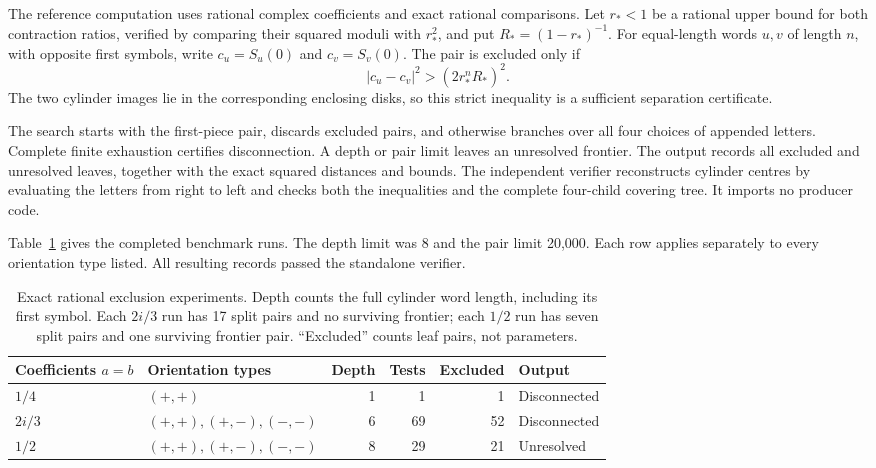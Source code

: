 The reference computation uses rational complex coefficients and exact rational
comparisons. Let $r_*<1$ be a rational upper bound for both contraction ratios,
verified by comparing their squared moduli with $r_*^2$, and put
$R_*=(1-r_*)^{-1}$. For equal-length words $u,v$ of length $n$, with opposite
first symbols, write $c_u=S_u(0)$ and $c_v=S_v(0)$. The pair is excluded only if
\begin{equation}\label{eq:exact-disk-exclusion}
|c_u-c_v|^2>(2r_*^nR_*)^2.
\end{equation}
The two cylinder images lie in the corresponding enclosing disks, so this
strict inequality is a sufficient separation certificate.

The search starts with the first-piece pair, discards excluded pairs, and
otherwise branches over all four choices of appended letters. Complete finite
exhaustion certifies disconnection. A depth or pair limit leaves an unresolved
frontier. The output records all excluded and unresolved leaves, together with
the exact squared distances and bounds. The independent verifier reconstructs
cylinder centres by evaluating the letters from right to left and checks both
the inequalities and the complete four-child covering tree. It imports no
producer code.

Table~\ref{tab:exact-benchmarks} gives the completed benchmark runs. The depth
limit was 8 and the pair limit 20,000. Each row applies separately to every
orientation type listed. All resulting records passed the standalone verifier.
\begin{table}[htbp]
\centering\small
\begin{tabular}{@{}llrrrl@{}}
\toprule
Coefficients $a=b$ & Orientation types & Depth & Tests & Excluded & Output\\
\midrule
$1/4$ & $(+,+)$ & 1 & 1 & 1 & Disconnected\\
$2i/3$ & $(+,+),(+,-),(-,-)$ & 6 & 69 & 52 & Disconnected\\
$1/2$ & $(+,+),(+,-),(-,-)$ & 8 & 29 & 21 & Unresolved\\
\bottomrule
\end{tabular}
\caption{Exact rational exclusion experiments. Depth counts the full cylinder
word length, including its first symbol. Each $2i/3$ run has 17 split pairs and
no surviving frontier; each $1/2$ run has seven split pairs and one surviving
frontier pair. ``Excluded'' counts leaf pairs, not parameters.}
\label{tab:exact-benchmarks}
\end{table}

